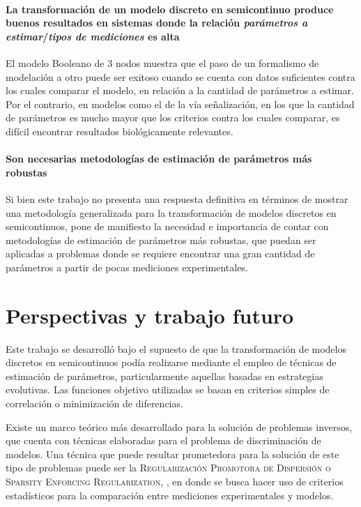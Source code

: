 \paragraph {La transformación de un modelo discreto en semicontinuo produce buenos resultados en sistemas donde la relación \emph{parámetros a estimar}/\emph{tipos de mediciones} es alta}El modelo Booleano de 3 nodos muestra que el paso de un formalismo de modelación a otro puede ser exitoso cuando se cuenta con datos suficientes contra los cuales comparar el modelo, en relación a la cantidad de parámetros a estimar. Por el contrario, en modelos como el de la vía señalización, en los que la cantidad de parámetros es mucho mayor que los criterios contra los cuales comparar, es difícil encontrar resultados biológicamente relevantes.

\paragraph {Son necesarias metodologías de estimación de parámetros más robustas} Si bien este trabajo no presenta una respuesta definitiva en términos de mostrar una metodología generalizada para la transformación de modelos discretos en semicontinuos, %
pone de manifiesto la necesidad e importancia de contar con metodologías de estimación de parámetros más robustas, que puedan ser aplicadas a problemas donde se requiere encontrar una gran cantidad de parámetros a partir de pocas mediciones experimentales.

\section{Perspectivas y trabajo futuro}

Este trabajo se desarrolló bajo el supuesto de que la transformación de modelos discretos en semicontinuos podía realizarse mediante el empleo de técnicas de estimación de parámetros, particularmente aquellas basadas en estrategias evolutivas. Las funciones objetivo utilizadas se basan en criterios simples de correlación o minimización de diferencias. 

Existe un marco teórico más desarrollado para la solución de problemas inversos, que cuenta con técnicas elaboradas para el problema de discriminación de modelos. Una técnica que puede resultar prometedora para la solución de este tipo de problemas puede ser la \textsc{Regularización Promotora de Dispersión o Sparsity Enforcing Regularization}, \citeauthor{Engl2009} \citep{Engl2009}, en donde se busca hacer uso de criterios estadísticos para la comparación entre mediciones experimentales y modelos.

